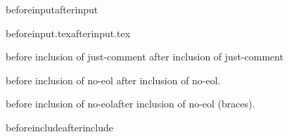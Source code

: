 \documentclass{article}
\begin{document}
beforeinputafterinput

beforeinput.texafterinput.tex

before inclusion of just-comment after inclusion of just-comment

before inclusion of no-eol after inclusion of no-eol.

before inclusion of no-eolafter inclusion of no-eol (braces).

beforeincludeafterinclude
\end{document}
